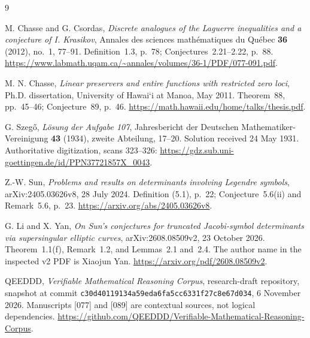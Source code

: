 \documentclass[11pt,a4paper]{article}
\theoremstyle{remark}
\begin{document}
\begin{thebibliography}{9}
\raggedright

M. Chasse and G. Csordas,
\emph{Discrete analogues of the Laguerre inequalities and a conjecture
of I. Krasikov},
Annales des sciences math\'ematiques du Qu\'ebec
\textbf{36} (2012), no.~1, 77--91.
Definition~1.3, p.~78; Conjectures~2.21--2.22, p.~88.
\url{https://www.labmath.uqam.ca/~annales/volumes/36-1/PDF/077-091.pdf}.

M. N. Chasse,
\emph{Linear preservers and entire functions with restricted zero loci},
Ph.D. dissertation, University of Hawai`i at Manoa, May 2011.
Theorem~88, pp.~45--46; Conjecture~89, p.~46.
\url{https://math.hawaii.edu/home/talks/thesis.pdf}.

G. Szeg\H{o},
\emph{L\"osung der Aufgabe 107},
Jahresbericht der Deutschen Mathematiker-Vereinigung
\textbf{43} (1934), zweite Abteilung, 17--20.
Solution received 24 May 1931.
Authoritative digitization, scans 323--326:
\url{https://gdz.sub.uni-goettingen.de/id/PPN37721857X_0043}.

Z.-W. Sun,
\emph{Problems and results on determinants involving Legendre symbols},
arXiv:2405.03626v8, 28 July 2024.
Definition (5.1), p.~22; Conjecture~5.6(ii) and Remark~5.6, p.~23.
\url{https://arxiv.org/abs/2405.03626v8}.

G. Li and X. Yan,
\emph{On Sun's conjectures for truncated Jacobi-symbol determinants
via supersingular elliptic curves},
arXiv:2608.08509v2, 23 October 2026.
Theorem~1.1(f), Remark~1.2, and Lemmas~2.1 and~2.4.
The author name in the inspected v2 PDF is Xiaojun Yan.
\url{https://arxiv.org/pdf/2608.08509v2}.

QEEDDD,
\emph{Verifiable Mathematical Reasoning Corpus},
research-draft repository, snapshot at commit
\texttt{c30d40119134a59eda6fa5cc6331f27c8e67d034},
6 November 2026.
Manuscripts [077] and [089] are contextual sources, not
logical dependencies.
\url{https://github.com/QEEDDD/Verifiable-Mathematical-Reasoning-Corpus}.

\end{thebibliography}
\end{document}
